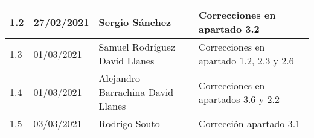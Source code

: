 \documentclass[12pt]{article}
\begin{document}
\begin{tabularx}{\textwidth}{ |l|l|p{5cm}|X| }
	\hline
	1.2              & 27/02/2021     & Sergio Sánchez                                                                                                           & Correcciones en apartado 3.2                 \\
	\hline
	1.3              & 01/03/2021     & Samuel Rodríguez \newline David Llanes                                                                                   & Correcciones en apartado 1.2, 2.3 y 2.6      \\
	\hline
	1.4              & 01/03/2021     & Alejandro Barrachina \newline David Llanes                                                                               & Correcciones en apartados 3.6 y 2.2          \\
	\hline
	1.5              & 03/03/2021     & Rodrigo Souto                                                                                                            & Corrección apartado 3.1                      \\
	\hline
\end{tabularx}

\newpage
\tableofcontents
\newpage


\newpage

\newpage

\end{document}
